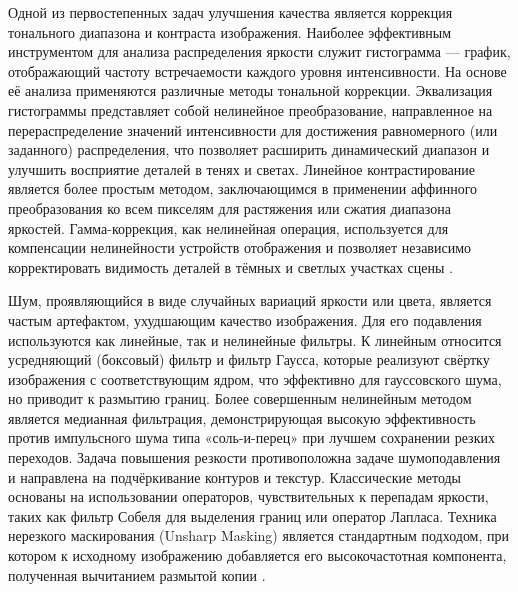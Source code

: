 \documentclass{SibFU-docs}
\begin{document}
Одной из первостепенных задач улучшения качества является коррекция тонального диапазона и контраста изображения. Наиболее эффективным инструментом для анализа распределения яркости служит гистограмма — график, отображающий частоту встречаемости каждого уровня интенсивности. На основе её анализа применяются различные методы тональной коррекции. Эквализация гистограммы представляет собой нелинейное преобразование, направленное на перераспределение значений интенсивности для достижения равномерного (или заданного) распределения, что позволяет расширить динамический диапазон и улучшить восприятие деталей в тенях и светах. Линейное контрастирование является более простым методом, заключающимся в применении аффинного преобразования ко всем пикселям для растяжения или сжатия диапазона яркостей. Гамма-коррекция, как нелинейная операция, используется для компенсации нелинейности устройств отображения и позволяет независимо корректировать видимость деталей в тёмных и светлых участках сцены \cite{opencv2023tutorials}.


Шум, проявляющийся в виде случайных вариаций яркости или цвета, является частым артефактом, ухудшающим качество изображения. Для его подавления используются как линейные, так и нелинейные фильтры. К линейным относится усредняющий (боксовый) фильтр и фильтр Гаусса, которые реализуют свёртку изображения с соответствующим ядром, что эффективно для гауссовского шума, но приводит к размытию границ. Более совершенным нелинейным методом является медианная фильтрация, демонстрирующая высокую эффективность против импульсного шума типа «соль-и-перец» при лучшем сохранении резких переходов. Задача повышения резкости противоположна задаче шумоподавления и направлена на подчёркивание контуров и текстур. Классические методы основаны на использовании операторов, чувствительных к перепадам яркости, таких как фильтр Собеля для выделения границ или оператор Лапласа. Техника нерезкого маскирования (Unsharp Masking) является стандартным подходом, при котором к исходному изображению добавляется его высокочастотная компонента, полученная вычитанием размытой копии \cite{gonzalez2018digital, opencv2023tutorials}.

\end{document}
